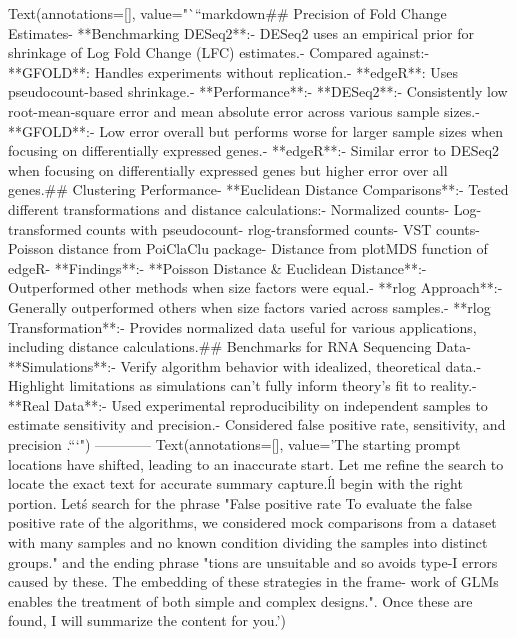 Text(annotations=[], value="```markdown\n## Precision of Fold Change Estimates\n\n- **Benchmarking DESeq2**:\n  - DESeq2 uses an empirical prior for shrinkage of Log Fold Change (LFC) estimates.\n  - Compared against:\n    - **GFOLD**: Handles experiments without replication.\n    - **edgeR**: Uses pseudocount-based shrinkage.\n\n- **Performance**:\n  - **DESeq2**:\n    - Consistently low root-mean-square error and mean absolute error across various sample sizes.\n  - **GFOLD**:\n    - Low error overall but performs worse for larger sample sizes when focusing on differentially expressed genes.\n  - **edgeR**:\n    - Similar error to DESeq2 when focusing on differentially expressed genes but higher error over all genes.\n\n## Clustering Performance\n\n- **Euclidean Distance Comparisons**:\n  - Tested different transformations and distance calculations:\n    - Normalized counts\n    - Log-transformed counts with pseudocount\n    - rlog-transformed counts\n    - VST counts\n    - Poisson distance from PoiClaClu package\n    - Distance from plotMDS function of edgeR\n  \n- **Findings**:\n  - **Poisson Distance & Euclidean Distance**:\n    - Outperformed other methods when size factors were equal.\n  - **rlog Approach**:\n    - Generally outperformed others when size factors varied across samples.\n  - **rlog Transformation**:\n    - Provides normalized data useful for various applications, including distance calculations.\n\n## Benchmarks for RNA Sequencing Data\n\n- **Simulations**:\n  - Verify algorithm behavior with idealized, theoretical data.\n  - Highlight limitations as simulations can't fully inform theory's fit to reality.\n\n- **Real Data**:\n  - Used experimental reproducibility on independent samples to estimate sensitivity and precision.\n  - Considered false positive rate, sensitivity, and precision   .\n```")
------------
Text(annotations=[], value='The starting prompt locations have shifted, leading to an inaccurate start. Let me refine the search to locate the exact text for accurate summary capture.\n\nWe\'ll begin with the right portion. Let\'s search for the phrase "False positive rate To evaluate the false positive rate of the algorithms, we considered mock comparisons from a dataset with many samples and no known condition dividing the samples into distinct groups." and the ending phrase "tions are unsuitable and so avoids type-I errors caused by these. The embedding of these strategies in the frame- work of GLMs enables the treatment of both simple and complex designs.". Once these are found, I will summarize the content for you.')